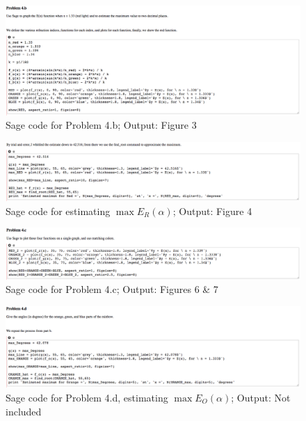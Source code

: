 \documentclass[letterpaper, 12pt]{amsart}
\theoremstyle{definition}  %
\begin{document}
		\begin{figure}[h]
			\includegraphics[width=\textwidth]{sage/images/3.png}
			\caption{Sage code for Problem 4.b; Output: Figure 3}
			\label{sage3}
		\end{figure}

		\begin{figure}[h]
			\includegraphics[width=\textwidth]{sage/images/4.png}
			\caption{Sage code for estimating $\max E_{R}(\alpha)$; Output: Figure 4}
			\label{sage4}
		\end{figure}

		\begin{figure}[h]
			\includegraphics[width=\textwidth]{sage/images/5.png}
			\caption{Sage code for Problem 4.c; Output: Figures 6 \& 7}
			\label{sage5}
		\end{figure}

		\begin{figure}[h]
			\includegraphics[width=\textwidth]{sage/images/6.png}
			\caption{Sage code for Problem 4.d, estimating $\max E_{O}(\alpha)$; Output: Not included}
			\label{sage6}
		\end{figure}
\end{document}
